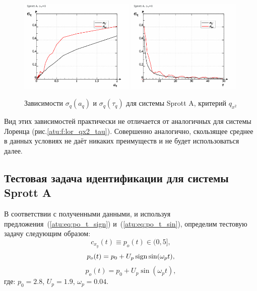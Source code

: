 \begin{figure}[htb!]
\begin{center}
  \includegraphics[width=0.49\textwidth]{p/cha/spr_a/sprott_a_qx2_tau-p_aq_sd.png}
  \hfill
  \includegraphics[width=0.49\textwidth]{p/cha/spr_a/sprott_a_qx2_tau-p_tau_sd.png}
\end{center}
  \caption{Зависимости $\sigma_{q}(a_q)$ и $\sigma_{q}(\tau_q)$ для системы Sprott A, критерий  $q_{x^2}$}
\label{atu:f:spr_a_qx2_tau}
\end{figure}

Вид этих зависимостей практически не отличается
от аналогичных для системы Лоренца (рис.\ref{atu:f:lor_qx2_tau}).
Совершенно аналогично, скользящее среднее в данных условиях
не даёт никаких преимуществ и не будет использоваться далее.



\subsection{Тестовая задача идентификации для системы Sprott A}   %

В соответствии с полученными данными, и используя
предложения~(\ref{atu:eq:po_t_sign}) и~(\ref{atu:eq:po_t_sin}),
определим тестовую задачу следующим образом:
\[
  c_{x_y}(t) \equiv p_o(t) \in (0, 5],
\]
%
\begin{equation}
  p_o(t) = p_0 +  U_{p} \operatorname*{sign} \sin( \omega_{p} t ),
  \label{atu:eq:spr_a_po_t_sign}
\end{equation}
%
%
\begin{equation}
  p_o(t) = p_0 +  U_{p} \sin( \omega_{p} t ),
  \label{atu:eq:spr_a_po_t_sin}
\end{equation}
%
где:
$p_0 = 2.8$, $U_p=1.9$, $\omega_p=0.04$.

